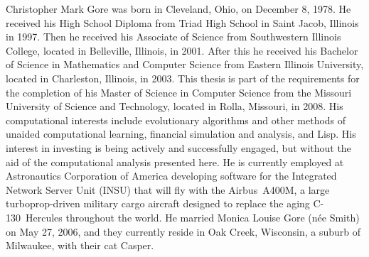 Christopher Mark Gore was born in Cleveland, Ohio, on December 8, 1978.
He received his High School Diploma from Triad High School in Saint Jacob, Illinois in 1997.
Then he received his Associate of Science from Southwestern Illinois College, located in Belleville, Illinois, in 2001.
After this he received his Bachelor of Science in Mathematics and Computer Science from Eastern Illinois University, located in Charleston, Illinois, in 2003.
This thesis is part of the requirements for the completion of his Master of Science in Computer Science from the Missouri University of Science and Technology, located in Rolla, Missouri, in 2008.
His computational interests include evolutionary algorithms and other methods of unaided computational learning, financial simulation and analysis, and Lisp.
His interest in investing is being actively and successfully engaged, but without the aid of the computational analysis presented here.
He is currently employed at Astronautics Corporation of America developing software for the Integrated Network Server Unit (INSU) that will fly with the Airbus~A400M, a large turboprop-driven military cargo aircraft designed to replace the aging C-130~Hercules throughout the world.
He married Monica Louise Gore (n\'ee Smith) on May 27, 2006, and they currently reside in Oak Creek, Wisconsin, a suburb of Milwaukee, with their cat Casper.

